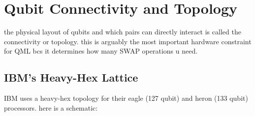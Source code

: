 \documentclass[11pt,a4paper]{article}
\theoremstyle{definition}
\theoremstyle{remark}
\begin{document}
\section{Qubit Connectivity and Topology}

the physical layout of qubits and which pairs can directly interact is called the connectivity or topology. this is arguably the most important hardware constraint for QML bcs it determines how many SWAP operations u need.

\subsection{IBM's Heavy-Hex Lattice}

IBM uses a heavy-hex topology for their eagle (127 qubit) and heron (133 qubit) processors. here is a schematic:
\end{document}
